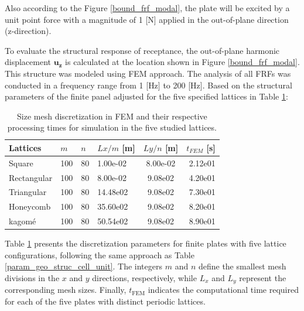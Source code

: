\documentclass[review,numbers,sort&compress]{elsarticle}
\begin{document}
Also according to the Figure \ref{bound_frf_modal}, the plate will be excited by a unit point force with a magnitude of 1 [N] applied in the out-of-plane direction (z-direction). 

To evaluate the structural response of receptance, the out-of-plane harmonic displacement $\mathbf{u_z}$ is calculated at the location shown in Figure \ref{bound_frf_modal}. This structure was modeled using FEM approach. The analysis of all FRFs was conducted in a frequency range from 1 [Hz] to 200 [Hz]. 
Based on the structural parameters of the finite panel adjusted for the five specified lattices in Table \ref{panel_param_latt}:

\begin{table}[htb]
	\centering
	\caption{Size mesh discretization in FEM and their respective processing times for simulation in the five studied lattices\protect\footnotemark.}
	\label{panel_param_latt}
	\begin{tabular}{llllcr}
		\hline
		Lattices \hspace{1 mm}  & $m$ \hspace{1 mm}& $n$ \hspace{1 mm}&  $Lx/m$ [m] \hspace{1 mm} & $Ly/n$ [m] \hspace{1 mm} &  $t_{FEM}$ [s]\hspace{1 mm}  \\
		\hline
		Square      & 100 &    80  &    1.00e-02  &    8.00e-02 &   2.12e01 \\
		Rectangular & 100 &    80  &    8.00e-02  &    9.08e02 &   4.20e01 \\
		Triangular  & 100 &    80  &    14.48e02 &     9.08e02 &   7.30e01 \\
		Honeycomb   & 100 &    80  &    35.60e02 &     9.08e02 &   8.20e01 \\
		kagomé      & 100 &    80  &    50.54e02 &     9.08e02 &   8.90e01  \\ 
		\hline
	\end{tabular}
\end{table}
Table \ref{panel_param_latt} presents the discretization parameters for finite plates with five lattice configurations, following the same approach as Table \ref{param_geo_struc_cell_unit}. The integers \( m \) and \( n \) define the smallest mesh divisions in the \( x \) and \( y \) directions, respectively, while \( L_x \) and \( L_y \) represent the corresponding mesh sizes. Finally, \( t_{\text{FEM}} \) indicates the computational time required for each of the five plates with distinct periodic lattices.
\end{document}
